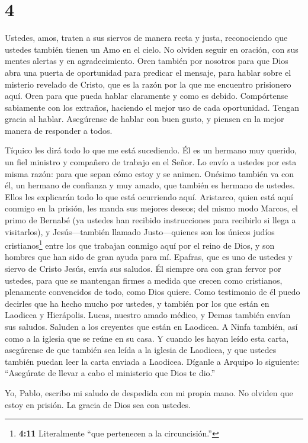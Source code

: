 \hypertarget{section-3}{%
\section{4}\label{section-3}}

 Ustedes, amos, traten a sus siervos de manera recta y
justa, reconociendo que ustedes también tienen un Amo en el cielo.
 No olviden seguir en oración, con sus mentes alertas y en
agradecimiento.  Oren también por nosotros para que Dios
abra una puerta de oportunidad para predicar el mensaje, para hablar
sobre el misterio revelado de Cristo, que es la razón por la que me
encuentro prisionero aquí.  Oren para que pueda hablar
claramente y como es debido.  Compórtense sabiamente con los
extraños, haciendo el mejor uso de cada oportunidad.  Tengan
gracia al hablar. Asegúrense de hablar con buen gusto, y piensen en la
mejor manera de responder a todos.

 Tíquico les dirá todo lo que me está sucediendo. Él es un
hermano muy querido, un fiel ministro y compañero de trabajo en el
Señor.  Lo envío a ustedes por esta misma razón: para que
sepan cómo estoy y se animen.  Onésimo también va con él, un
hermano de confianza y muy amado, que también es hermano de ustedes.
Ellos les explicarán todo lo que está ocurriendo aquí. 
Aristarco, quien está aquí conmigo en la prisión, les manda sus mejores
deseos; del mismo modo Marcos, el primo de Bernabé (ya ustedes han
recibido instrucciones para recibirlo si llega a visitarlos),
 y Jesús---también llamado Justo---quienes son los únicos
judíos cristianos\footnote{\textbf{4:11} Literalmente ``que pertenecen a
  la circuncisión.''} entre los que trabajan conmigo aquí por el reino
de Dios, y son hombres que han sido de gran ayuda para mí. 
Epafras, que es uno de ustedes y siervo de Cristo Jesús, envía sus
saludos. Él siempre ora con gran fervor por ustedes, para que se
mantengan firmes a medida que crecen como cristianos, plenamente
convencidos de todo, como Dios quiere.  Como testimonio de
él puedo decirles que ha hecho mucho por ustedes, y también por los que
están en Laodicea y Hierápolis.  Lucas, nuestro amado
médico, y Demas también envían sus saludos.  Saluden a los
creyentes que están en Laodicea. A Ninfa también, así como a la iglesia
que se reúne en su casa.  Y cuando les hayan leído esta
carta, asegúrense de que también sea leída a la iglesia de Laodicea, y
que ustedes también puedan leer la carta enviada a Laodicea.
 Díganle a Arquipo lo siguiente: ``Asegúrate de llevar a
cabo el ministerio que Dios te dio.''

 Yo, Pablo, escribo mi saludo de despedida con mi propia
mano. No olviden que estoy en prisión. La gracia de Dios sea con
ustedes.
